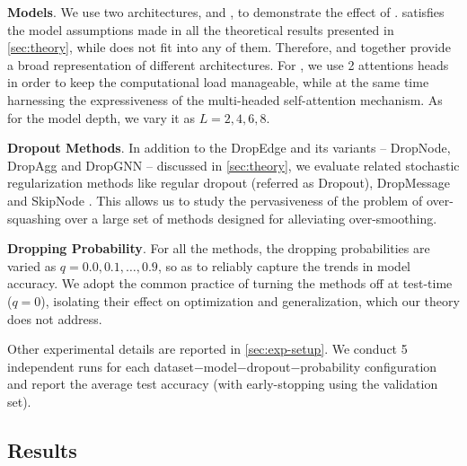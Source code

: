 \textbf{Models}. We use two  architectures,  and , to demonstrate the effect of .  satisfies the model assumptions made in all the theoretical results presented in \autoref{sec:theory}, while  does not fit into any of them. Therefore,  and  together provide a broad representation of different  architectures. For , we use 2 attentions heads in order to keep the computational load manageable, while at the same time harnessing the expressiveness of the multi-headed self-attention mechanism. As for the model depth, we vary it as $L = 2, 4, 6, 8$.

\textbf{Dropout Methods}. In addition to the DropEdge and its variants -- DropNode, DropAgg and DropGNN -- discussed in \autoref{sec:theory}, we evaluate related stochastic regularization methods like regular dropout \citep{srivastava2014dropout} (referred as Dropout), DropMessage \citep{Fang2022DropMessageUR} and SkipNode \cite{lu2024skipnode}. This allows us to study the pervasiveness of the problem of over-squashing over a large set of methods designed for alleviating over-smoothing.

\textbf{Dropping Probability}. For all the methods, the dropping probabilities are varied as $q=0.0, 0.1, \ldots, 0.9$, so as to reliably capture the trends in model accuracy. We adopt the common practice of turning the methods off at test-time ($q=0$), isolating their effect on optimization and generalization, which our theory does not address. 

Other experimental details are reported in \autoref{sec:exp-setup}. We conduct 5 independent runs for each dataset$-$model$-$dropout$-$probability configuration and report the average test accuracy (with early-stopping using the validation set). %

\subsection{Results}

\newcommand{\positive}{ForestGreen}
\newcommand{\negative}{Bittersweet} %

